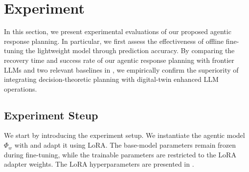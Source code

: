 \documentclass[sigconf]{acmart}
\begin{document}
%

\section{Experiment}\label{sec:experiment}
In this section, we present experimental evaluations of our proposed agentic response planning. In particular, we first assess the effectiveness of offline fine-tuning the lightweight model through prediction accuracy. By comparing the recovery time and success rate of our agentic response planning with frontier LLMs and two relevant baselines in \cite{guo25ircopilot, kim26ndss}, we empirically confirm the superiority of integrating decision-theoretic planning with digital-twin enhanced LLM operations. 

\subsection{Experiment Steup}
We start by introducing the experiment setup.   We instantiate the agentic model $\Phi_w$ with
   and adapt it using LoRA. The
  base-model parameters remain frozen during fine-tuning, while the trainable
  parameters are restricted to the LoRA adapter weights. The LoRA hyperparameters are presented in . 
\end{document}
